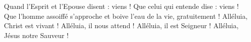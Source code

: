 

Quand l’Esprit et l’Epouse disent : viens ! Que celui qui entende dise : viens !
Que l’homme assoiffé s’approche et boive l’eau de la vie, gratuitement !
Alléluia, Christ est vivant ! Alléluia, il nous attend !
Alléluia, il est Seigneur ! Alléluia, Jésus notre Sauveur !

